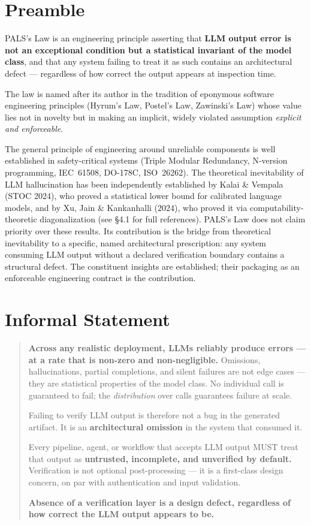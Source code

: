 \documentclass[11pt,a4paper]{article}
\begin{document}
\section{Preamble}

PALS's Law is an engineering principle asserting that \textbf{LLM output error is not an exceptional condition but a statistical invariant of the model class}, and that any system failing to treat it as such contains an architectural defect --- regardless of how correct the output appears at inspection time.

The law is named after its author in the tradition of eponymous software engineering principles (Hyrum's Law, Postel's Law, Zawinski's Law) whose value lies not in novelty but in making an implicit, widely violated assumption \emph{explicit and enforceable}.

The general principle of engineering around unreliable components is well established in safety-critical systems (Triple Modular Redundancy, N-version programming, IEC~61508, DO-178C, ISO~26262). The theoretical inevitability of LLM hallucination has been independently established by Kalai \& Vempala (STOC 2024), who proved a statistical lower bound for calibrated language models, and by Xu, Jain \& Kankanhalli (2024), who proved it via computability-theoretic diagonalization (see \S4.1 for full references). PALS's Law does not claim priority over these results. Its contribution is the bridge from theoretical inevitability to a specific, named architectural prescription: any system consuming LLM output without a declared verification boundary contains a structural defect. The constituent insights are established; their packaging as an enforceable engineering contract is the contribution.

\section{Informal Statement}

\begin{quote}
\textbf{Across any realistic deployment, LLMs reliably produce errors --- at a rate that is non-zero and non-negligible.} Omissions, hallucinations, partial completions, and silent failures are not edge cases --- they are statistical properties of the model class. No individual call is guaranteed to fail; the \emph{distribution} over calls guarantees failure at scale.

Failing to verify LLM output is therefore not a bug in the generated artifact. It is an \textbf{architectural omission} in the system that consumed it.

Every pipeline, agent, or workflow that accepts LLM output MUST treat that output as \textbf{untrusted, incomplete, and unverified by default.} Verification is not optional post-processing --- it is a first-class design concern, on par with authentication and input validation.

\textbf{Absence of a verification layer is a design defect, regardless of how correct the LLM output appears to be.}
\end{quote}
\end{document}
